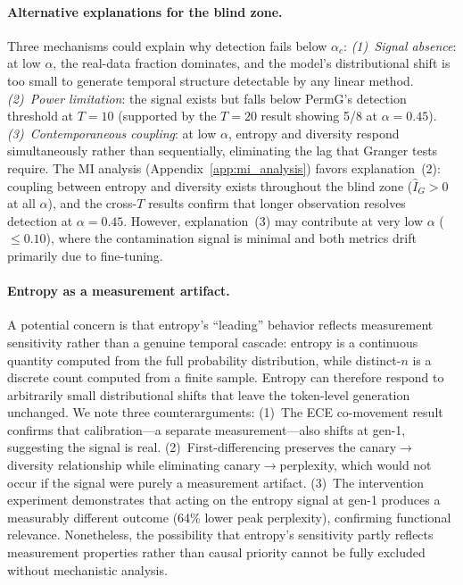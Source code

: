 \paragraph{Alternative explanations for the blind zone.}
Three mechanisms could explain why detection fails below $\alpha_c$:
\emph{(1)~Signal absence}: at low $\alpha$, the real-data fraction dominates, and the model's distributional shift is too small to generate temporal structure detectable by any linear method.
\emph{(2)~Power limitation}: the signal exists but falls below PermG's detection threshold at $T{=}10$ (supported by the $T{=}20$ result showing 5/8 at $\alpha{=}0.45$).
\emph{(3)~Contemporaneous coupling}: at low $\alpha$, entropy and diversity respond simultaneously rather than sequentially, eliminating the lag that Granger tests require.
The MI analysis (Appendix~\ref{app:mi_analysis}) favors explanation~(2): coupling between entropy and diversity exists throughout the blind zone ($\hat{I}_G > 0$ at all $\alpha$), and the cross-$T$ results confirm that longer observation resolves detection at $\alpha{=}0.45$.
However, explanation~(3) may contribute at very low $\alpha$ (${\leq}0.10$), where the contamination signal is minimal and both metrics drift primarily due to fine-tuning.

\paragraph{Entropy as a measurement artifact.}
A potential concern is that entropy's ``leading'' behavior reflects measurement sensitivity rather than a genuine temporal cascade: entropy is a continuous quantity computed from the full probability distribution, while distinct-$n$ is a discrete count computed from a finite sample.
Entropy can therefore respond to arbitrarily small distributional shifts that leave the token-level generation unchanged.
We note three counterarguments:
(1)~The ECE co-movement result confirms that calibration---a separate measurement---also shifts at gen-1, suggesting the signal is real.
(2)~First-differencing preserves the canary$\to$diversity relationship while eliminating canary$\to$perplexity, which would not occur if the signal were purely a measurement artifact.
(3)~The intervention experiment demonstrates that acting on the entropy signal at gen-1 produces a measurably different outcome (64\% lower peak perplexity), confirming functional relevance.
Nonetheless, the possibility that entropy's sensitivity partly reflects measurement properties rather than causal priority cannot be fully excluded without mechanistic analysis.

